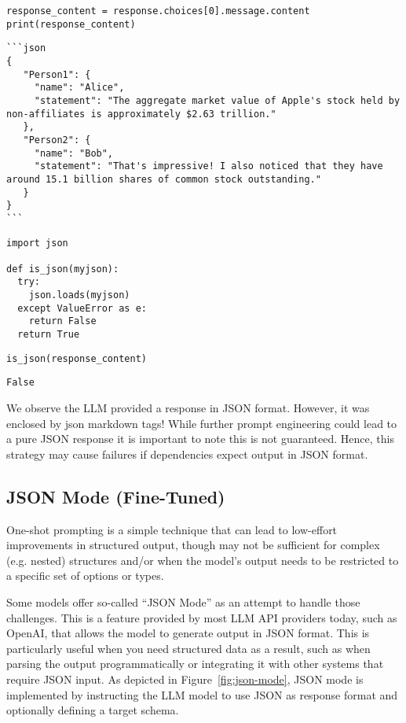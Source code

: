 \begin{verbatim}
response_content = response.choices[0].message.content
print(response_content)
\end{verbatim}

\begin{verbatim}
```json
{
   "Person1": {
     "name": "Alice", 
     "statement": "The aggregate market value of Apple's stock held by non-affiliates is approximately $2.63 trillion."
   },
   "Person2": {
     "name": "Bob",
     "statement": "That's impressive! I also noticed that they have around 15.1 billion shares of common stock outstanding."
   }
}
```
\end{verbatim}

\begin{verbatim}
import json

def is_json(myjson):
  try:
    json.loads(myjson)
  except ValueError as e:
    return False
  return True
\end{verbatim}

\begin{verbatim}
is_json(response_content)
\end{verbatim}

\begin{verbatim}
False
\end{verbatim}



We observe the LLM provided a response in JSON format. However, it was enclosed by json markdown tags! While further prompt engineering could lead to a pure JSON response it is important to note this is not guaranteed. Hence, this strategy may cause failures if dependencies expect output in JSON format.
\subsection{JSON Mode (Fine-Tuned)}

One-shot prompting is a simple technique that can lead to low-effort improvements in structured output, though may not be sufficient for complex (e.g. nested) structures and/or when the model's output needs to be restricted to a specific set of options or types.

Some models offer so-called ``JSON Mode'' as an attempt to handle those challenges. This is a feature provided by most LLM API providers today, such as OpenAI, that allows the model to generate output in JSON format. This is particularly useful when you need structured data as a result, such as when parsing the output programmatically or integrating it with other systems that require JSON input. As depicted in Figure~\ref{fig:json-mode}, JSON mode is implemented by instructing the LLM model to use JSON as response format and optionally defining a target schema.

